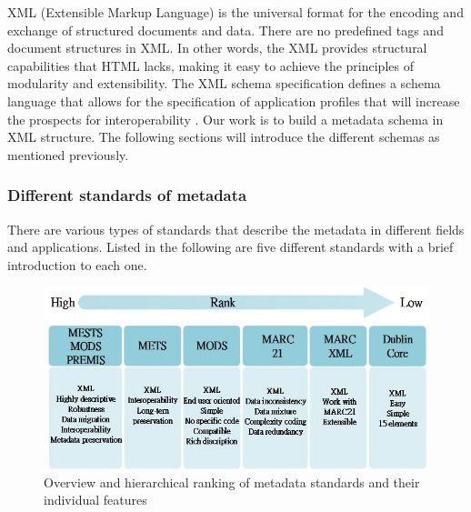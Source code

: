 XML (Extensible Markup Language) is the universal format for the encoding and exchange of structured documents and data. 
There are no predefined tags and document structures in XML. 
In other words, the XML provides structural capabilities that HTML lacks, making it easy to achieve the principles of modularity and extensibility. 
The XML schema specification defines a schema language that allows for the specification of application profiles that will increase the prospects for interoperability \cite{duval2002metadata}. 
Our work is to build a metadata schema in XML structure. The following sections will introduce the different schemas as mentioned previously.


\subsubsection*{Different standards of metadata}
\label{sec:mets}
There are various types of standards that describe the metadata in different fields and applications. 
Listed in the following are five different standards with a brief introduction to each one.

\begin{figure}		
	\begin{center}
		\includegraphics[width=1.8\columnwidth]{EagleUnit_Background_Chart_1}
	\end{center}
	\caption{Overview and hierarchical ranking of metadata standards and their individual features}
\end{figure}

